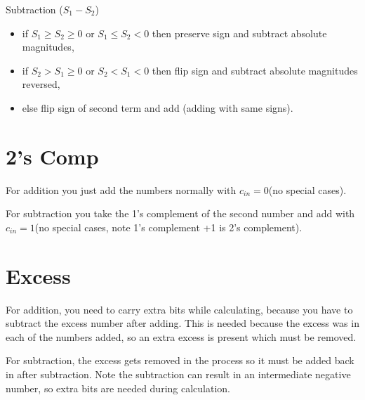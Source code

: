 \noindent
Subtraction ($S_1-S_2$)
\begin{itemize}
    \item if $S_1 \ge S_2 \ge 0$ or $S_1 \le S_2 < 0$ then preserve sign and subtract absolute magnitudes,
    \item if $S_2 > S_1 \ge 0$ or $S_2 < S_1 < 0$ then flip sign and subtract absolute magnitudes reversed,
    \item else flip sign of second term and add (adding with same signs).
\end{itemize}

\section{2's Comp}

For addition you just add the numbers normally with $c_{in}=0$(no special cases).

For subtraction you take the 1's complement of the second number and add with $c_{in}=1$(no special cases, note 1's complement +1 is 2's complement).

\section{Excess}

For addition, you need to carry extra bits while calculating, because you have to subtract the excess number after adding.  This is needed because the excess was in each of the numbers added, so an extra excess is present which must be removed.

For subtraction, the excess gets removed in the process so it must be added back in after subtraction.  Note the subtraction can result in an intermediate negative number, so extra bits are needed during calculation. 